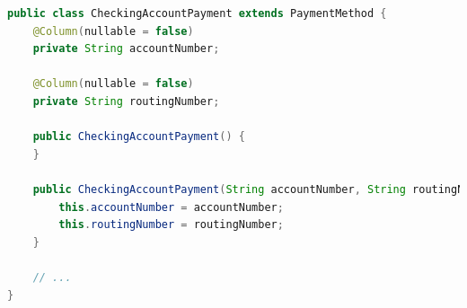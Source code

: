 \documentclass{article}
\begin{document}
\begin{lstlisting}[language=Java, caption={Checking Account Payment Implementation}]
public class CheckingAccountPayment extends PaymentMethod {
    @Column(nullable = false)
    private String accountNumber;

    @Column(nullable = false)
    private String routingNumber;

    public CheckingAccountPayment() {
    }

    public CheckingAccountPayment(String accountNumber, String routingNumber) {
        this.accountNumber = accountNumber;
        this.routingNumber = routingNumber;
    }
    
    // ...
}
\end{lstlisting}
\end{document}
